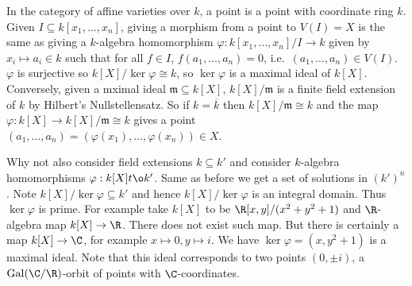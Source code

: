 \documentclass[a4paper]{article}
\begin{document}
In the category of affine varieties over \(k\), a point is a point with coordinate ring \(k\). Given \(I \subseteq k[x_1, \dots, x_n]\), giving a morphism from a point to \(V(I) = X\) is the same as giving a \(k\)-algebra homomorphism \(\varphi: k[x_1, \dots, x_n]/I \to k\) given by \(x_i \mapsto a_i \in k\) such that for all \(f \in I\), \(f(a_1, \dots, a_n) = 0\), i.e.\ \((a_1, \dots, a_n) \in V(I)\). \(\varphi\) is surjective so \(k[X]/\ker \varphi \cong k\), so \(\ker \varphi\) is a maximal ideal of \(k[X]\). Conversely, given a mximal ideal \(\mathfrak m \subseteq k[X]\), \(k[X]/\mathfrak m\) is a finite field extension of \(k\) by Hilbert's Nullstellensatz. So if \(k = \overline k\) then \(k[X]/\mathfrak m \cong k\) and the map \(\varphi: k[X] \to k[X]/\mathfrak m \cong k\) gives a point \((a_1, \dots, a_n) = (\varphi(x_1), \dots, \varphi(x_n)) \in X\).

Why not also consider field extensions \(k \subseteq k'\) and consider \(k\)-algebra homomorphisms \(\varphi: k[X] t\o k'\). Same as before we get a set of solutions in \((k')^n\). Note \(k[X]/\ker \varphi \subseteq k'\) and hence \(k[X]/\ker \varphi\) is an integral domain. Thus \(\ker \varphi\) is prime. For example take \(k[X]\) to be \(\R[x, y]/(x^2 + y^2 + 1)\) and \(\R\)-algebra map \(k[X] \to \R\). There does not exist such map. But there is certainly a map \(k[X] \to \C\), for example \(x \mapsto 0, y \mapsto i\). We have \(\ker \varphi = (x, y^2 + 1)\) is a maximal ideal. Note that this ideal corresponds to two points \((0, \pm i)\), a \(\operatorname{Gal}(\C/\R)\)-orbit of points with \(\C\)-coordinates.

\printindex
\end{document}
